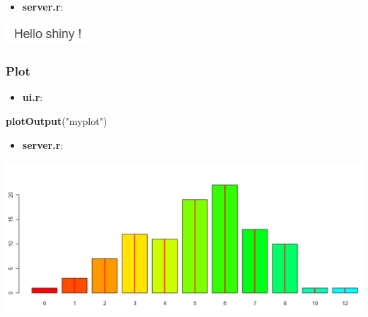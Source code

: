\documentclass[
]{article}
\newenvironment{Shaded}{\begin{snugshade}}{\end{snugshade}}
\newcommand{\FunctionTok}[1]{\textcolor[rgb]{0.13,0.29,0.53}{\textbf{#1}}}
\newcommand{\NormalTok}[1]{#1}
\newcommand{\OtherTok}[1]{\textcolor[rgb]{0.56,0.35,0.01}{#1}}
\newcommand{\SpecialCharTok}[1]{\textcolor[rgb]{0.81,0.36,0.00}{\textbf{#1}}}
\newcommand{\StringTok}[1]{\textcolor[rgb]{0.31,0.60,0.02}{#1}}
\providecommand{\tightlist}{%
  \setlength{\itemsep}{0pt}\setlength{\parskip}{0pt}}
\begin{document}
\begin{itemize}
\tightlist
\item
  \textbf{server.r}:
\end{itemize}

\begin{Shaded}
\end{Shaded}

\includegraphics{img/otext2.png}

\hypertarget{plot}{%
\subsubsection{Plot}\label{plot}}

\begin{itemize}
\tightlist
\item
  \textbf{ui.r}:
\end{itemize}

\begin{Shaded}
\begin{Highlighting}[]
\FunctionTok{plotOutput}\NormalTok{(}\StringTok{"myplot"}\NormalTok{)}
\end{Highlighting}
\end{Shaded}

\begin{itemize}
\tightlist
\item
  \textbf{server.r}:
\end{itemize}

\begin{Shaded}
\end{Shaded}

\includegraphics{img/oplot.png}
\end{document}
